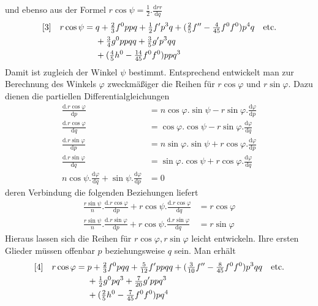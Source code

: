 %
und ebenso aus der Formel \(r\cos\psi=\tfrac{1}{2}\mathord{.}\frac{\mathrm{d}rr}{\mathrm{d}q}\)
\[
\begin{aligned}
\relax[3]\quad r\cos\psi={}&q+\tfrac{2}{3}f^0ppq+\tfrac{1}{2}f'p^3q+(\tfrac{2}{5}f''-\tfrac{4}{45}f^0f^0)p^4q\quad\text{etc.}\\
&+\tfrac{3}{4}g^0ppqq+\tfrac{3}{5}g'p^3qq\\
&+(\tfrac{4}{5}h^0-\tfrac{14}{45}f^0f^0)ppq^3
\end{aligned}
\]
Damit ist zugleich der Winkel \(\psi\) bestimmt. Entsprechend entwickelt man zur Berechnung des Winkels \(\varphi\) zweckmäßiger die Reihen für \(r\cos\varphi\) und \(r\sin\varphi\). Dazu dienen die partiellen Differentialgleichungen
\[
\begin{aligned}
\frac{\mathrm{d}\mathord{.}r\cos\varphi}{\mathrm{d}p}&=n\cos\varphi\mathord{.}\sin\psi-r\sin\varphi\mathord{.}\frac{\mathrm{d}\varphi}{\mathrm{d}p}\\
\frac{\mathrm{d}\mathord{.}r\cos\varphi}{\mathrm{d}q}&=\cos\varphi\mathord{.}\cos\psi-r\sin\varphi\mathord{.}\frac{\mathrm{d}\varphi}{\mathrm{d}q}\\
\frac{\mathrm{d}\mathord{.}r\sin\varphi}{\mathrm{d}p}&=n\sin\varphi\mathord{.}\sin\psi+r\cos\varphi\mathord{.}\frac{\mathrm{d}\varphi}{\mathrm{d}p}\\
\frac{\mathrm{d}\mathord{.}r\sin\varphi}{\mathrm{d}q}&=\sin\varphi\mathord{.}\cos\psi+r\cos\varphi\mathord{.}\frac{\mathrm{d}\varphi}{\mathrm{d}q}\\
n\cos\psi\mathord{.}\frac{\mathrm{d}\varphi}{\mathrm{d}q}+\sin\psi\mathord{.}\frac{\mathrm{d}\varphi}{\mathrm{d}p}&=0
\end{aligned}
\]
deren Verbindung die folgenden Beziehungen liefert
\[
\begin{aligned}
\frac{r\sin\psi}{n}\mathord{.}\frac{\mathrm{d}\mathord{.}r\cos\varphi}{\mathrm{d}p}+r\cos\psi\mathord{.}\frac{\mathrm{d}\mathord{.}r\cos\varphi}{\mathrm{d}q}&=r\cos\varphi\\
\frac{r\sin\psi}{n}\mathord{.}\frac{\mathrm{d}\mathord{.}r\sin\varphi}{\mathrm{d}p}+r\cos\psi\mathord{.}\frac{\mathrm{d}\mathord{.}r\sin\varphi}{\mathrm{d}q}&=r\sin\varphi
\end{aligned}
\]
Hieraus lassen sich die Reihen für \(r\cos\varphi,r\sin\varphi\) leicht entwickeln. Ihre ersten Glieder müssen offenbar \(p\) beziehungsweise \(q\) sein. Man erhält
\[
\begin{aligned}
\relax[4]\quad r\cos\varphi={}&p+\tfrac{2}{3}f^0pqq+\tfrac{5}{12}f'ppqq+(\tfrac{3}{10}f''-\tfrac{8}{45}f^0f^0)p^3qq\quad\text{etc.}\\
&+\tfrac{1}{2}g^0pq^3+\tfrac{7}{20}g'ppq^3\\
&+(\tfrac{2}{5}h^0-\tfrac{7}{45}f^0f^0)pq^4
\end{aligned}
\]
